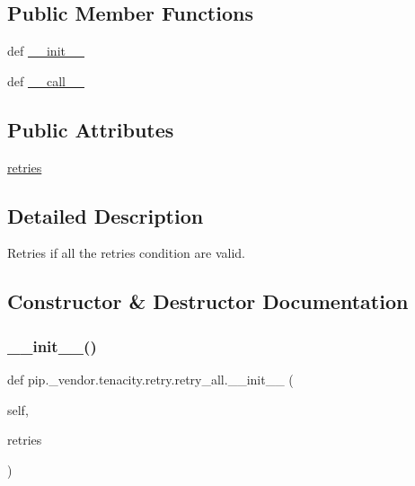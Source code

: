 \subsection*{Public Member Functions}
\begin{DoxyCompactItemize}
\item 
def \hyperlink{classpip_1_1__vendor_1_1tenacity_1_1retry_1_1retry__all_a8dcf381b08ffff4ae1abcaa080ac25d1}{\+\_\+\+\_\+init\+\_\+\+\_\+}
\item 
def \hyperlink{classpip_1_1__vendor_1_1tenacity_1_1retry_1_1retry__all_a5e5fa2b2faf5acacf7747d81bdc4b463}{\+\_\+\+\_\+call\+\_\+\+\_\+}
\end{DoxyCompactItemize}
\subsection*{Public Attributes}
\begin{DoxyCompactItemize}
\item 
\hyperlink{classpip_1_1__vendor_1_1tenacity_1_1retry_1_1retry__all_a336b29d3458b7fc9705f7a70cbe92256}{retries}
\end{DoxyCompactItemize}


\subsection{Detailed Description}
\begin{DoxyVerb}Retries if all the retries condition are valid.\end{DoxyVerb}
 

\subsection{Constructor \& Destructor Documentation}
\mbox{\label{classpip_1_1__vendor_1_1tenacity_1_1retry_1_1retry__all_a8dcf381b08ffff4ae1abcaa080ac25d1}} 
\subsubsection{\texorpdfstring{\+\_\+\+\_\+init\+\_\+\+\_\+()}{\_\_init\_\_()}}
{\footnotesize\ttfamily def pip.\+\_\+vendor.\+tenacity.\+retry.\+retry\+\_\+all.\+\_\+\+\_\+init\+\_\+\+\_\+ (\begin{DoxyParamCaption}\item[{}]{self,  }\item[{}]{retries }\end{DoxyParamCaption})}



